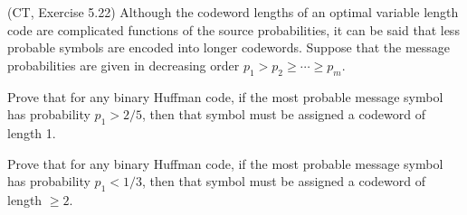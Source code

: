 \documentclass[a4paper,10pt,landscape,twocolumn]{scrartcl}
\begin{document}
\begin{bonusexercise}
(CT, Exercise 5.22) Although the codeword lengths of an optimal variable length code are complicated functions of the source probabilities, it can be said that less probable symbols are encoded into longer codewords. Suppose that the message probabilities are given in decreasing order $p_1 > p_2 \geq \cdots \geq p_m$.
	\begin{subex}
	Prove that for any binary Huffman code, if the most probable message symbol has probability $p_1 > 2/5$, then that symbol must be assigned a codeword of length 1.
	\end{subex}
	\begin{subex}
	Prove that for any binary Huffman code, if the most probable message symbol has probability $p_1 < 1/3$, then that symbol must be assigned a codeword of length $\geq 2$.
	\end{subex}
\end{bonusexercise}
\end{document}
